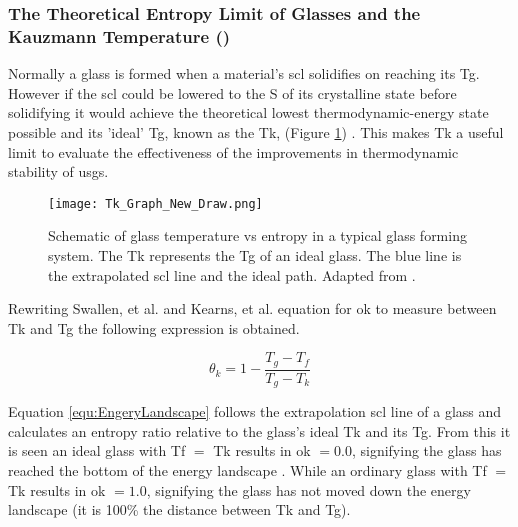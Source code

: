 \documentclass[a4paper,12pt,oneside]{report}%
\begin{document}
\subsubsection{The Theoretical Entropy Limit of Glasses and the Kauzmann Temperature (\Tk)}
Normally a glass is formed when a material's \gls{scl} solidifies on reaching its \gls{Tg}. However if the \gls{scl} could be lowered to the \gls{S} of its crystalline state before solidifying it would achieve the theoretical lowest thermodynamic-energy state possible and its 'ideal' \gls{Tg}, known as the \gls{Tk},  (Figure \ref{fig:TkGraph}) \cite{Swallen2007, Kearns2008}.  This makes \gls{Tk} a useful limit to evaluate the effectiveness of the improvements in thermodynamic stability of \glspl{usg}. 

\begin{figure}[htbp]
	\centering
	\texttt{[image: Tk\_Graph\_New\_Draw.png]}
	\caption[Schematic of glass temperature vs entropy in a typical glass forming system. The \acrfull{Tk} represents the \acrfull{Tg} of an ideal glass. The blue line is the extrapolated \acrshort{scl} line and the ideal path.]{Schematic of glass temperature vs entropy in a typical glass forming system. The \acrfull{Tk} represents the \acrfull{Tg} of an ideal glass. The blue line is the extrapolated \acrshort{scl} line and the ideal path. Adapted from \cite{Ediger1996, Kearns2008}.}
	\label{fig:TkGraph}
\end{figure}

Rewriting Swallen, et al. \cite{Swallen2007} and Kearns, et al. \cite{Kearns2008} equation for \gls{ok} to measure between \gls{Tk} and \gls{Tg} the following expression is obtained. 

\begin{equation}
\theta_{k} = 1 - \frac{T_{g}-T_{f}}{T_{g}-T_{k}}
\label{equ:EngeryLandscape}
\end{equation}

Equation \ref{equ:EngeryLandscape} follows the extrapolation \gls{scl} line of a glass and calculates an entropy ratio relative to the glass's ideal \gls{Tk} and its \gls{Tg}. From this it is seen an ideal glass with \gls{Tf} $=$ \gls{Tk} results in \gls{ok} $=0.0$, signifying the glass has reached the bottom of the energy landscape \cite{Swallen2007, Kearns2008}. While an ordinary glass with \gls{Tf} $=$ \gls{Tk} results in \gls{ok} $=1.0$, signifying the glass has not moved down the energy landscape (it is 100\% the distance between \gls{Tk} and \gls{Tg}).
\end{document}
